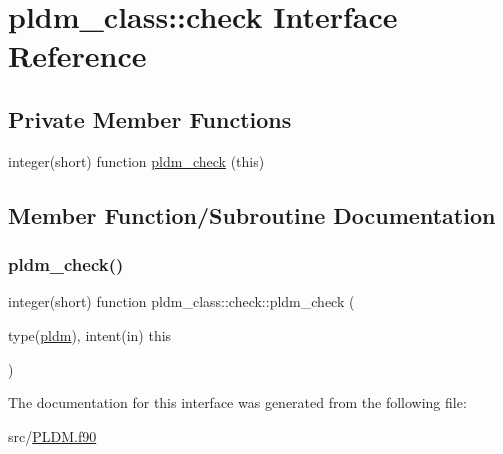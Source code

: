 \hypertarget{interfacepldm__class_1_1check}{}\section{pldm\+\_\+class\+:\+:check Interface Reference}
\label{interfacepldm__class_1_1check}
\subsection*{Private Member Functions}
\begin{DoxyCompactItemize}
\item 
integer(short) function \hyperlink{interfacepldm__class_1_1check_a1487f82ce4231c72f10b8d47af8e798b}{pldm\+\_\+check} (this)
\end{DoxyCompactItemize}


\subsection{Member Function/\+Subroutine Documentation}
\mbox{\label{interfacepldm__class_1_1check_a1487f82ce4231c72f10b8d47af8e798b}} 
\subsubsection{\texorpdfstring{pldm\+\_\+check()}{pldm\_check()}}
{\footnotesize\ttfamily integer(short) function pldm\+\_\+class\+::check\+::pldm\+\_\+check (\begin{DoxyParamCaption}\item[{type(\hyperlink{structpldm__class_1_1pldm}{pldm}), intent(in)}]{this }\end{DoxyParamCaption})\hspace{0.3cm}{\ttfamily [private]}}



The documentation for this interface was generated from the following file\+:\begin{DoxyCompactItemize}
\item 
src/\hyperlink{_p_l_d_m_8f90}{P\+L\+D\+M.\+f90}\end{DoxyCompactItemize}
